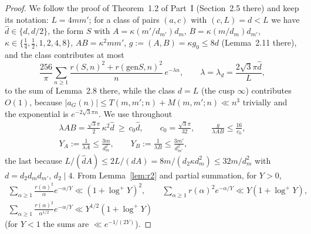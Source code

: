 ﻿\documentclass[11pt]{amsart}
\theoremstyle{remark}
\newcommand{\gen}{\mathrm{gen}}
\newcommand{\rk}{r}
\begin{document}
\begin{proof}
We follow the proof of Theorem~1.2 of Part~I (Section~2.5 there) and keep its notation: $L=4mm'$; for a class of pairs $(a,c)$ with $(c,L)=d<L$ we have $\hat d\in\{d,d/2\}$, the form $S$ with $A=\kappa(m'/d_{m'})d_m$, $B=\kappa(m/d_m)d_{m'}$, $\kappa\in\{\frac14,\frac12,1,2,4,8\}$, $AB=\kappa^2mm'$, $g:=(A,B)=\kappa g_0\le8d$ (Lemma~2.11 there), and the class contributes at most
\begin{equation}\label{eq:classbound}
\frac{256}\pi\sum_{n\ge1}\frac{\rk(S,n)^2+\rk(\gen S,n)^2}{n}\,e^{-\lambda n},\qquad \lambda=\lambda_d=\frac{2\sqrt3\pi\hat d}{L},
\end{equation}
to the sum of Lemma~2.8 there, while the class $d=L$ (the cusp $\infty$) contributes $O(1)$, because $|a_G(n)|\le T(m,m';n)+M(m,m';n)\ll n^3$ trivially and the exponential is $e^{-2\sqrt3\pi n}$. We use throughout
\begin{equation}\label{eq:lamAB}
\begin{gathered}
\lambda AB=\frac{\sqrt3\pi}2\,\kappa^2\hat d\ \ge\ c_0\hat d,\qquad c_0=\frac{\sqrt3\pi}{32},\qquad \frac{g}{\lambda AB}\le\frac{16}{c_0},\\
Y_A:=\frac1{\lambda A}\le\frac{3m}{d_m^2},\qquad Y_B:=\frac1{\lambda B}\le\frac{3m'}{d_{m'}^2},
\end{gathered}
\end{equation}
the last because $L/(\hat dA)\le2L/(dA)=8m/(d_2\kappa d_m^2)\le32m/d_m^2$ with $d=d_2d_md_{m'}$, $d_2\mid4$. From Lemma~\ref{lem:r2} and partial summation, for $Y>0$,
\begin{equation}\label{eq:rsums}
\begin{gathered}
\sum_{\alpha\ge1}\frac{r(\alpha)^2}{\alpha}e^{-\alpha/Y}\ll(1+\log^+Y)^2,\qquad \sum_{\alpha\ge1}r(\alpha)^2e^{-\alpha/Y}\ll Y(1+\log^+Y),\\
\sum_{\alpha\ge1}\frac{r(\alpha)^2}{\alpha^{1/2}}e^{-\alpha/Y}\ll Y^{1/2}(1+\log^+Y)
\end{gathered}
\end{equation}
(for $Y<1$ the sums are $\ll e^{-1/(2Y)}$).


\end{proof}
\end{document}

